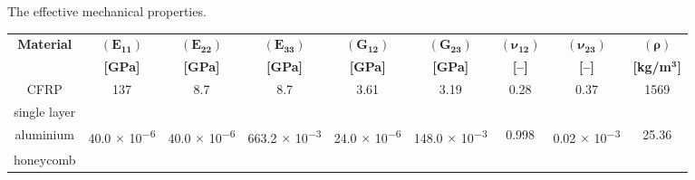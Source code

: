 \documentclass[sensors,article,accept,moreauthors,pdftex]{Definitions/mdpi}
\begin{document}
\nointerlineskip
\appendix
\vspace{-12pt}
\begin{specialtable}[H]
\small
\widetable
\tabcolsep=0.25cm
	\caption{\label{tab:properties_eff} The effective mechanical properties.}
	\begin{tabular}{ccccccccc}
		\toprule
		\multirow{2}{*}{\textbf{Material}} & $(\boldsymbol{E_{11}})$ & $(\boldsymbol{E_{22}})$ & $(\boldsymbol{E_{33}})$ & $(\boldsymbol{G_{12}})$ & $(\boldsymbol{G_{23}})$ & $(\boldsymbol{\nu_{12}})$ 
		& $(\boldsymbol{\nu_{23}})$ & $(\boldsymbol{\rho})$ \\
		& \textbf{[GPa]} & \textbf{[GPa]} & \textbf{[GPa]} & \textbf{[GPa]} & \textbf{[GPa]} & \textbf{[--]} & \textbf{[--]} & \textbf{[kg/m}$\boldsymbol{^3}$\textbf{]}\\
		\midrule
		CFRP & 137 & 8.7 & 8.7 & 3.61 & 3.19 & 0.28 & 0.37 & 1569\\
		single layer & & & & & & & &\\ \midrule
		aluminium & 40.0 $\times$ 10\textsuperscript{$-$6} & 40.0 $\times$ 10\textsuperscript{$-$6} & 663.2 $\times$ 10\textsuperscript{$-$3} & 24.0 $\times$ 10\textsuperscript{$-$6} & 148.0 $\times$ 10\textsuperscript{$-$3} & 0.998 & 0.02 $\times$ 10\textsuperscript{$-$3} & 25.36\\
		honeycomb & & & & & & & &\\
		\bottomrule
	\end{tabular}
\end{specialtable}
\end{document}
